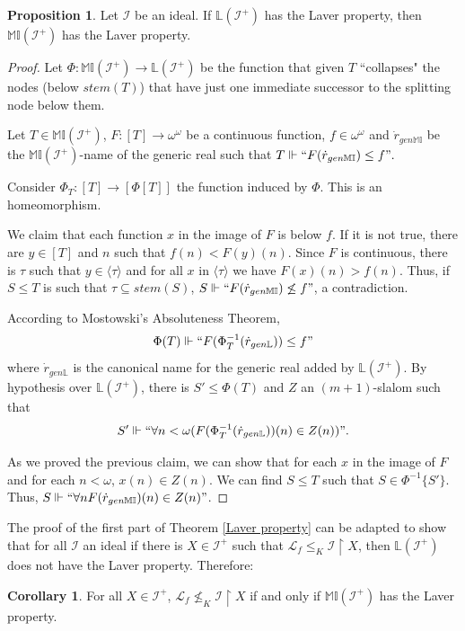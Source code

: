 \documentclass{amsart}
\theoremstyle{definition}
\newtheorem{coro}[theorem]{Corollary}
\newtheorem{proposition}[theorem]{Proposition}
\theoremstyle{remark}
\numberwithin{equation}{section}
\newcommand{\lf}{\mathcal{L}_f}
\newcommand{\li}{\mathbb{L}(\mathcal{I}^+)}
\newcommand{\lav}{\mathbb{L}}
\newcommand{\mil}{\mathbb{MI}}
\newcommand{\id}{\mathcal{I}}
\begin{document}
\begin{proposition} \label{li implies mi}
    Let $\id$ be an ideal. If $\li$ has the Laver property, then $\mil(\id^+)$ has the Laver property.
\end{proposition}
\begin{proof}
Let $\Phi: \mil(\id^+)\rightarrow \li$ be the function that given $T$ ``collapses"  the nodes  (below $stem(T)$) that have just one immediate successor to the splitting node below them.

Let $T\in\mil(\id^+)$, $F:[T]\rightarrow \omega^\omega$ be a continuous function, $f\in\omega^\omega$ and $\dot r_{gen \mil}$ be the $\mil(\id^+)$-name of the generic real such that $ T\Vdash``F(\dot r_{gen\mil})\leq f".$

Consider $\Phi_T:[T]\rightarrow [\Phi[T]]$ the function induced by $\Phi$. This is an homeomorphism.

We claim that each function $x$ in the image of $F$ is below $f$. If it is not true, there are $y\in[T]$ and $n$ such that $f(n)<F(y)(n)$. Since $F$ is continuous, there is $\tau$ such that $y\in\langle \tau \rangle $ and for all $x$ in $\langle \tau \rangle$ we have $F(x)(n)>f(n)$. Thus, if $S\leq T$ is such that $\tau \subseteq stem(S)$, $S\Vdash`` F(\dot r_{gen\mil})\not\leq f"$, a contradiction.

According to Mostowski’s Absoluteness Theorem, 
\[\Phi(T)\Vdash`` F(\Phi^{-1}_T (\dot r_{gen\lav}))\leq f"\]
where $\dot r_{gen\lav}$ is the canonical name for the generic real added by $\li$. By hypothesis over $\li$, there is $S'\leq \Phi(T)$ and $Z$ an $(m+1)$-slalom such that \[S'\Vdash`` \forall n<\omega (F(\Phi^{-1}_T (\dot r_{gen\lav}))(n)\in Z(n))".\]

As we proved the previous claim, we can show that for each $x$ in the image of $F$ and for each $n<\omega$, $x(n)\in Z(n)$. We can find $S\leq T$ such that $S\in\Phi^{-1}\{S'\}$. Thus, $S\Vdash``\forall n F(\dot r_{gen\mil})(n)\in Z(n)"$.
\end{proof}

The proof of the first part of Theorem \ref{Laver property} can be adapted to show that for all $\id$ an ideal if there is $X\in\id^+$ such that $\lf\leq_K \id\upharpoonright X$, then $\li$ does not have the Laver property. Therefore:

\begin{coro}
    For all $X\in \id^+$, $\mathcal{L}_f\not\leq_{K}\id\upharpoonright X$ if and only if $\mil(\id^+)$ has the Laver property.
\end{coro}
\end{document}
